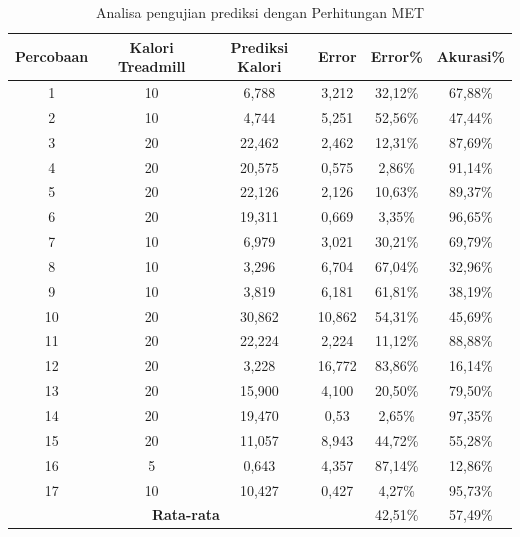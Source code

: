 \begin{longtable}{|c|c|c|c|c|c|}
  \caption{Analisa pengujian prediksi dengan Perhitungan MET}
  \label{tb:AnalisaPrediksiPerhitungan}                                   \\
  \hline
  \rowcolor[HTML]{C0C0C0}
  \textbf{Percobaan} & \textbf{Kalori Treadmill} & \textbf{Prediksi Kalori} & \textbf{Error} & \textbf{Error\%} & \textbf{Akurasi\%} \\
  \hline
  1   & 10   & 6,788   & 3,212    & 32,12\%     & 67,88\%   \\
  \hline
  2   & 10   & 4,744   & 5,251    & 52,56\%     & 47,44\%   \\
  \hline
  3   & 20   & 22,462  & 2,462    & 12,31\%     & 87,69\%   \\
  \hline
  4   & 20   & 20,575  & 0,575    & 2,86\%      & 91,14\%   \\
  \hline
  5   & 20   & 22,126  & 2,126    & 10,63\%     & 89,37\%   \\
  \hline
  6   & 20   & 19,311  & 0,669    & 3,35\%      & 96,65\%   \\
  \hline
  7   & 10   & 6,979   & 3,021    & 30,21\%     & 69,79\%   \\
  \hline
  8   & 10   & 3,296   & 6,704    & 67,04\%     & 32,96\%   \\
  \hline
  9   & 10   & 3,819   & 6,181    & 61,81\%     & 38,19\%   \\
  \hline
  10   & 20   & 30,862  & 10,862   & 54,31\%     & 45,69\%   \\
  \hline
  11   & 20   & 22,224  & 2,224    & 11,12\%     & 88,88\%   \\
  \hline
  12   & 20   & 3,228   & 16,772   & 83,86\%     & 16,14\%   \\
  \hline
  13   & 20   & 15,900  & 4,100    & 20,50\%     & 79,50\%   \\
  \hline
  14   & 20   & 19,470  & 0,53     & 2,65\%      & 97,35\%   \\
  \hline
  15   & 20   & 11,057  & 8,943    & 44,72\%     & 55,28\%   \\
  \hline
  16   & 5    & 0,643   & 4,357    & 87,14\%     & 12,86\%   \\
  \hline
  17   & 10   & 10,427  & 0,427    & 4,27\%      & 95,73\%   \\
  \hline

  \multicolumn{4}{|c|}{\textbf{Rata-rata}} & 42,51\% & 57,49\% \\
  \hline
\end{longtable}

